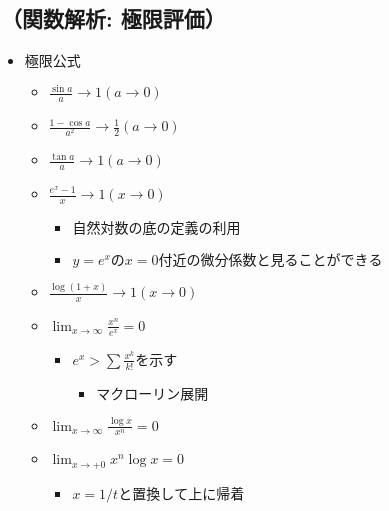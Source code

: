 \documentclass[dvipdfmx,uplatex]{jsarticle}
\begin{document}
\subsection{（関数解析: 極限評価）}
\begin{itemize}
	\item $ 極限公式$
	\begin{itemize}
		\item $ \frac{\sin a}{a} \to 1 (a \to 0)$
		\item $ \frac{1 - \cos a}{a^2} \to \frac{1}{2} (a \to 0)$
		\item $ \frac{\tan a}{a} \to 1(a \to 0)$
		\item $ \frac{e^x -1}{x} \to 1 (x \to 0)$
		\begin{itemize}
			\item $ 自然対数の底の定義の利用$
			\item $ y = e^x の x=0 付近の微分係数と見ることができる$
		\end{itemize}
		\item $ \frac{\log (1 + x)}{x} \to 1 (x \to 0)$
		\item $ \lim_{x \to \infty} \frac{x^n}{e^x} = 0$
		\begin{itemize}
			\item $ e^x > \sum \frac{x^k}{k!} を示す$
			\begin{itemize}
				\item $ マクローリン展開$
			\end{itemize}
		\end{itemize}
		\item $ \lim_{x \to \infty} \frac{\log x}{x^n} =0$
		\item $ \lim_{x \to +0} x^n \log x = 0$
		\begin{itemize}
			\item $ x = 1/t と置換して上に帰着$
		\end{itemize}
	\end{itemize}
\end{itemize}
\end{document}
